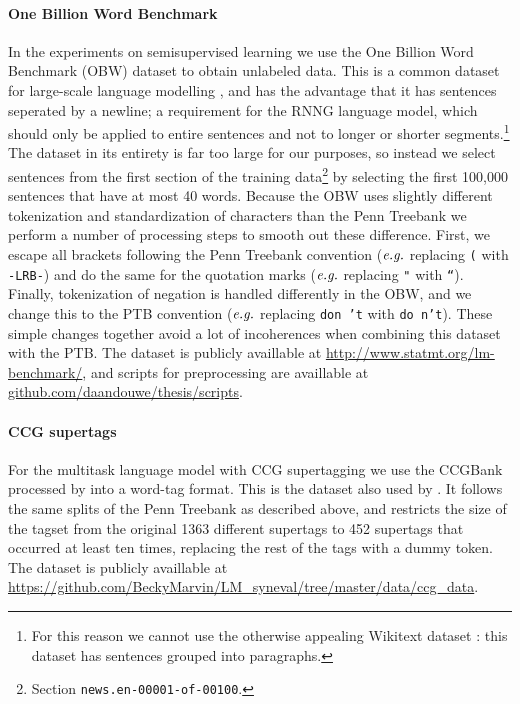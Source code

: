\paragraph{One Billion Word Benchmark}
In the experiments on semisupervised learning we use the One Billion Word Benchmark (OBW) dataset \citep{chelba2013one} to obtain unlabeled data. This is a common dataset for large-scale language modelling \citep{jozefowicz2016exploring}, and has the advantage that it has sentences seperated by a newline; a requirement for the RNNG language model, which should only be applied to entire sentences and not to longer or shorter segments.\footnote{For this reason we cannot use the otherwise appealing Wikitext dataset \citep{merity2016pointer}: this dataset has sentences grouped into paragraphs.} The dataset in its entirety is far too large for our purposes, so instead we select sentences from the first section of the training data\footnote{Section \texttt{news.en-00001-of-00100}.} by selecting the first 100,000 sentences that have at most 40 words. Because the OBW uses slightly different tokenization and standardization of characters than the Penn Treebank we perform a number of processing steps to smooth out these difference. First, we escape all brackets following the Penn Treebank convention ($\emph{e.g.}$ replacing \texttt{(} with \texttt{-LRB-}) and do the same for the quotation marks ($\emph{e.g.}$ replacing \texttt{"} with \texttt{``}). Finally, tokenization of negation is handled differently in the OBW, and we change this to the PTB convention ($\emph{e.g.}$ replacing \texttt{don 't} with \texttt{do n't}). These simple changes together avoid a lot of incoherences when combining this dataset with the PTB. The dataset is publicly availlable at \url{http://www.statmt.org/lm-benchmark/}, and scripts for preprocessing are availlable at \url{github.com/daandouwe/thesis/scripts}.

\paragraph{CCG supertags}
For the multitask language model with CCG supertagging we use the CCGBank \citep{hockenmaier2007ccgbank} processed by \citet{enguehard2017multitask} into a word-tag format. This is the dataset also used by \citet{linzen2018targeted}. It follows the same splits of the Penn Treebank as described above, and restricts the size of the tagset from the original 1363 different supertags to 452 supertags that occurred at least ten times, replacing the rest of the tags with a dummy token. The dataset is publicly availlable at \url{https://github.com/BeckyMarvin/LM_syneval/tree/master/data/ccg_data}.


